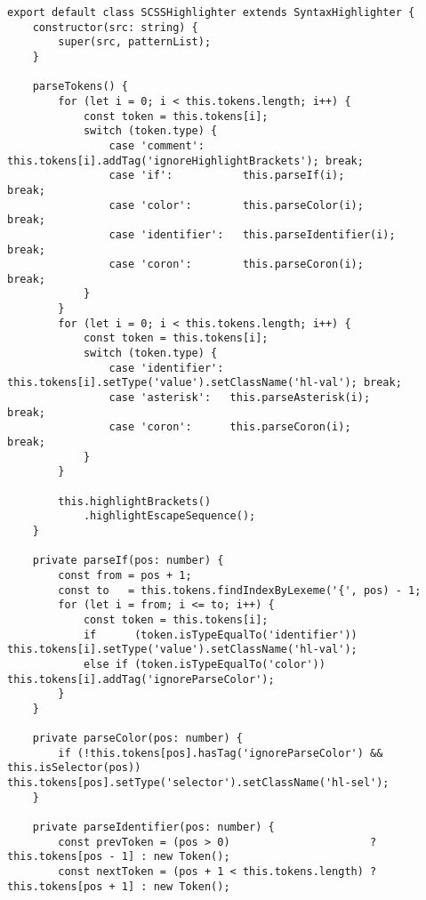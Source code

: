 \documentclass[autodetect-engine,dvi=dvipdfmx,ja=standard,
               a4j,11pt]{bxjsarticle}
\begin{document}
\begin{lstlisting}[caption={CSS/SCSSハイライタ({\tt scss.ts})(2)}, label={prog:scss2}]
export default class SCSSHighlighter extends SyntaxHighlighter {
    constructor(src: string) {
        super(src, patternList);
    }

    parseTokens() {
        for (let i = 0; i < this.tokens.length; i++) {
            const token = this.tokens[i];
            switch (token.type) {
                case 'comment':      this.tokens[i].addTag('ignoreHighlightBrackets'); break;
                case 'if':           this.parseIf(i);                                  break;
                case 'color':        this.parseColor(i);                               break;
                case 'identifier':   this.parseIdentifier(i);                          break;
                case 'coron':        this.parseCoron(i);                               break;
            }
        }
        for (let i = 0; i < this.tokens.length; i++) {
            const token = this.tokens[i];
            switch (token.type) {
                case 'identifier': this.tokens[i].setType('value').setClassName('hl-val'); break;
                case 'asterisk':   this.parseAsterisk(i);                                  break;
                case 'coron':      this.parseCoron(i);                                     break;
            }
        }

        this.highlightBrackets()
            .highlightEscapeSequence();
    }

    private parseIf(pos: number) {
        const from = pos + 1;
        const to   = this.tokens.findIndexByLexeme('{', pos) - 1;
        for (let i = from; i <= to; i++) {
            const token = this.tokens[i];
            if      (token.isTypeEqualTo('identifier')) this.tokens[i].setType('value').setClassName('hl-val');
            else if (token.isTypeEqualTo('color'))      this.tokens[i].addTag('ignoreParseColor');
        }
    }

    private parseColor(pos: number) {
        if (!this.tokens[pos].hasTag('ignoreParseColor') && this.isSelector(pos)) this.tokens[pos].setType('selector').setClassName('hl-sel');
    }

    private parseIdentifier(pos: number) {
        const prevToken = (pos > 0)                      ? this.tokens[pos - 1] : new Token();
        const nextToken = (pos + 1 < this.tokens.length) ? this.tokens[pos + 1] : new Token();


\end{lstlisting}
\end{document}
